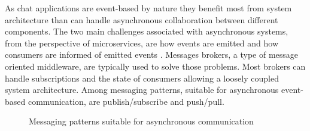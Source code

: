 As chat applications are event-based by nature they benefit most from system architecture than can handle asynchronous collaboration between different components. The two main challenges associated with asynchronous systems, from the perspective of microservices, are how events are emitted and how consumers are informed of emitted events \cite{newman2015building}. Messages brokers, a type of message oriented middleware, are typically used to solve those problems. Most brokers can handle subscriptions and the state of consumers allowing a loosely coupled system architecture. Among messaging patterns, suitable for asynchronous event-based communication, are publish/subscribe and push/pull.
\\
\begin{figure}[h!]
	\centering
	 \hfill
	\caption{Messaging patterns suitable for asynchronous communication \cite{hintjens2010zeromq}}
\end{figure}

